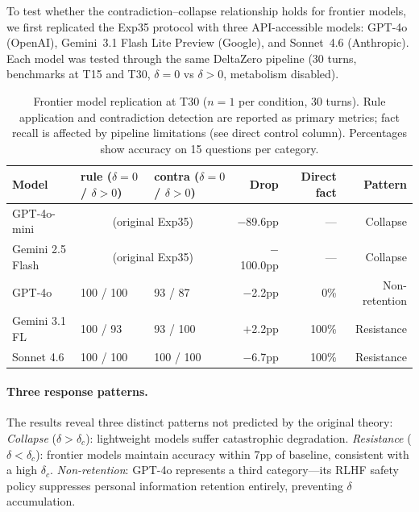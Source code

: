 \documentclass[11pt,a4paper]{article}
\begin{document}
To test whether the contradiction--collapse relationship holds for frontier models, we first replicated the Exp35 protocol with three API-accessible models: GPT-4o (OpenAI), Gemini~3.1 Flash Lite Preview (Google), and Sonnet~4.6 (Anthropic). Each model was tested through the same DeltaZero pipeline (30 turns, benchmarks at T15 and T30, $\delta = 0$ vs $\delta > 0$, metabolism disabled).

\begin{table}[htbp]
\centering
\caption{Frontier model replication at T30 ($n = 1$ per condition, 30 turns). Rule application and contradiction detection are reported as primary metrics; fact recall is affected by pipeline limitations (see direct control column). Percentages show accuracy on 15 questions per category.}
\label{tab:frontier}
\small
\begin{tabular}{lp{2.6cm}p{2.6cm}rrr}
\toprule
Model & rule ($\delta{=}0$ / $\delta{>}0$) & contra ($\delta{=}0$ / $\delta{>}0$) & Drop & Direct fact & Pattern \\
\midrule
GPT-4o-mini & \multicolumn{2}{c}{(original Exp35)} & $-$89.6pp & --- & Collapse \\
Gemini 2.5 Flash & \multicolumn{2}{c}{(original Exp35)} & $-$100.0pp & --- & Collapse \\
\midrule
GPT-4o & 100 / 100 & 93 / 87 & $-$2.2pp & 0\% & Non-retention \\
Gemini 3.1 FL & 100 / 93 & 93 / 100 & $+$2.2pp & 100\% & Resistance \\
Sonnet 4.6 & 100 / 100 & 100 / 100 & $-$6.7pp & 100\% & Resistance \\
\bottomrule
\end{tabular}
\end{table}

\paragraph{Three response patterns.}
The results reveal three distinct patterns not predicted by the original theory:
\emph{Collapse} ($\delta > \delta_c$): lightweight models suffer catastrophic degradation.
\emph{Resistance} ($\delta < \delta_c$): frontier models maintain accuracy within 7pp of baseline, consistent with a high $\delta_c$.
\emph{Non-retention}: GPT-4o represents a third category---its RLHF safety policy suppresses personal information retention entirely, preventing $\delta$ accumulation.
\end{document}
